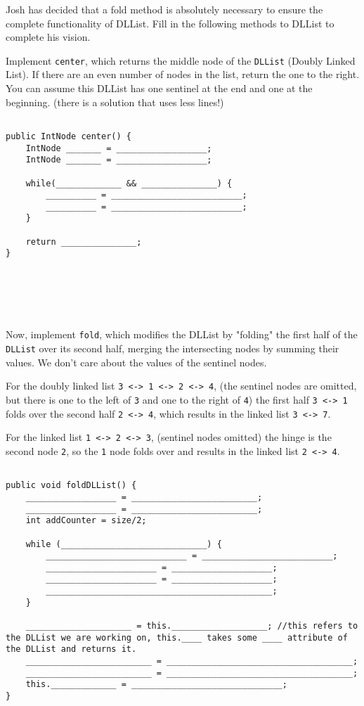 \question Josh has decided that a fold method is absolutely necessary to ensure the complete functionality of DLList. Fill in the following methods to DLList to complete his vision.

Implement \lstinline$center$, which returns the middle node of the \lstinline$DLList$ (Doubly Linked List). If there are an even number of nodes in the list, return the one to the right. You can assume this DLList has one sentinel at the end and one at the beginning. (there is a solution that uses less lines!)
\begin{lstlisting}

public IntNode center() {
    IntNode _______ = __________________;
    IntNode _______ = __________________;
    
    while(_____________ && _______________) {
        __________ = __________________________;
        __________ = __________________________;
    }

    return _______________;
}






\end{lstlisting}
\question Now, implement \lstinline$fold$, which modifies the DLList by "folding" the first half of the \lstinline$DLList$ over its second half, merging the intersecting nodes by summing their values. We don't care about the values of the sentinel nodes.

For the doubly linked list \lstinline$3 <-> 1 <-> 2 <-> 4$, (the sentinel nodes are omitted, but there is one to the left of \lstinline$3$ and one to the right of \lstinline$4$) the first half \lstinline$3 <-> 1$ folds over the second half \lstinline$2 <-> 4$, which results in the linked list \lstinline$3 <-> 7$.

For the linked list \lstinline$1 <-> 2 <-> 3$, (sentinel nodes omitted) the hinge is the second node \lstinline$2$, so the \lstinline$1$ node folds over and results in the linked list \lstinline$2 <-> 4$.

\clearpage

\begin{lstlisting}

public void foldDLList() {
	__________________ = _________________________;
	__________________ = _________________________;
	int addCounter = size/2;
    
	while (_____________________________) {
		____________________________ = __________________________;
		______________________ = ____________________;
		______________________ = ____________________;
		_____________________________________________;
	}
	
	_____________________ = this.___________________; //this refers to the DLList we are working on, this.____ takes some ____ attribute of the DLList and returns it. 
	_________________________ = _____________________________________;
	_________________________ = _____________________________________;
	this._____________ = ______________________________;
}
\end{lstlisting}

